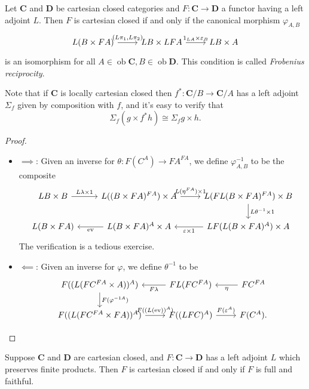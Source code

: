 \documentclass[a4paper]{article}
\renewcommand{\c}[1]{\mathbf{#1}}
\DeclareMathOperator{\ob}{ob}
\begin{document}
\begin{theorem}
  Let \(\c C\) and \(\c D\) be cartesian closed categories and \(F: \c C \to \c D\) a functor having a left adjoint \(L\). Then \(F\) is cartesian closed if and only if the canonical morphism \(\varphi_{A, B}\)
  \[
    \begin{tikzcd}
      L(B \times FA) \ar[r, "{(L\pi_1, L\pi_2)}"] & LB \times LFA \ar[r, "1_{LA} \times \varepsilon_B"] & LB \times A
    \end{tikzcd}
  \]
  is an isomorphism for all \(A \in \ob \c C, B \in \ob \c D\). This condition is called \emph{Frobenius reciprocity}.
\end{theorem}

Note that if \(\c C\) is locally cartesian closed then \(f^*: \c C/B \to \c C/A\) has a left adjoint \(\Sigma_f\) given by composition with \(f\), and it's easy to verify that
\[
  \Sigma_f(g \times f^*h) \cong \Sigma_f g \times h.
\]

\begin{proof}\leavevmode
  \begin{itemize}
  \item \(\implies\): Given an inverse for \(\theta: F(C^A) \to FA^{FA}\), we define \(\varphi_{A, B}^{-1}\) to be the composite
    \[
      \begin{tikzcd}
        LB \times B \ar[r, "L\lambda \times 1"] & L((B \times FA)^{FA}) \times A \ar[r, "L(\eta^{FA}) \times 1"] & L(FL(B \times FA)^{FA}) \times B \ar[d, "L\theta^{-1} \times 1"] \\
        L(B \times FA) & L(B \times FA)^A \times A \ar[l, "\operatorname{ev}"] & LF(L(B \times FA)^A) \times A \ar[l, "\varepsilon \times 1"]
      \end{tikzcd}
    \]
    The verification is a tedious exercise.
  \item \(\impliedby\): Given an inverse for \(\varphi\), we define \(\theta^{-1}\) to be
    \[
      \begin{tikzcd}
        F((L(FC^{FA} \times A))^A) \ar[d, "F(\varphi^{-1 A})"] & FL(FC^{FA}) \ar[l, "F\lambda"] & FC^{FA} \ar[l, "\eta"] \\
        F((L(FC^{FA} \times FA))^A) \ar[r, "F((L(\operatorname{ev}))^A)"] & F((LFC)^A) \ar[r, "F(\varepsilon^A)"] & F(C^A).
      \end{tikzcd}
    \]
  \end{itemize}
\end{proof}

\begin{corollary}
  Suppose \(\c C\) and \(\c D\) are cartesian closed, and \(F: \c C \to \c D\) has a left adjoint \(L\) which preserves finite products. Then \(F\) is cartesian closed if and only if \(F\) is full and faithful.
\end{corollary}
\end{document}
